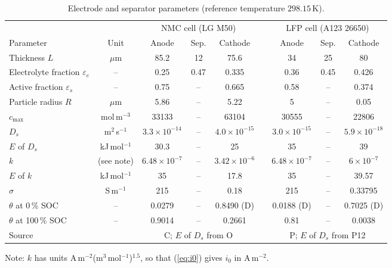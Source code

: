 \documentclass[11pt]{article}
\newcommand{\eps}{\varepsilon}
\newcommand{\unit}[1]{\,\mathrm{#1}}
\begin{document}
\begin{table}[ht]
\centering\small
\caption{Electrode and separator parameters (reference temperature $298.15\unit{K}$).}\label{tab:electrode}
\begin{tabular}{@{}l c ccc c ccc@{}}
\toprule
 & & \multicolumn{3}{c}{NMC cell (LG M50)} & & \multicolumn{3}{c}{LFP cell (A123 26650)}\\
\cmidrule{3-5}\cmidrule{7-9}
Parameter & Unit & Anode & Sep. & Cathode & & Anode & Sep. & Cathode\\
\midrule
Thickness $L$ & $\mu$m & 85.2 & 12 & 75.6 & & 34 & 25 & 80\\
Electrolyte fraction $\eps_e$ & -- & 0.25 & 0.47 & 0.335 & & 0.36 & 0.45 & 0.426\\
Active fraction $\eps_s$ & -- & 0.75 & -- & 0.665 & & 0.58 & -- & 0.374\\
Particle radius $R$ & $\mu$m & 5.86 & -- & 5.22 & & 5 & -- & 0.05\\
$c_{\max}$ & mol\,m$^{-3}$ & 33133 & -- & 63104 & & 30555 & -- & 22806\\
$D_s$ & m$^2$\,s$^{-1}$ & $3.3\!\times\!10^{-14}$ & -- & $4.0\!\times\!10^{-15}$ & & $3.0\!\times\!10^{-15}$ & -- & $5.9\!\times\!10^{-18}$\\
$E$ of $D_s$ & kJ\,mol$^{-1}$ & 30.3 & -- & 25 & & 35 & -- & 39\\
$k$ & (see note) & $6.48\!\times\!10^{-7}$ & -- & $3.42\!\times\!10^{-6}$ & & $6.48\!\times\!10^{-7}$ & -- & $6\!\times\!10^{-7}$\\
$E$ of $k$ & kJ\,mol$^{-1}$ & 35 & -- & 17.8 & & 35 & -- & 39.57\\
$\sigma$ & S\,m$^{-1}$ & 215 & -- & 0.18 & & 215 & -- & 0.33795\\
$\theta$ at 0\,\% SOC & -- & 0.0279 & -- & 0.8490 (D) & & 0.0188 (D) & -- & 0.7025 (D)\\
$\theta$ at 100\,\% SOC & -- & 0.9014 & -- & 0.2661 & & 0.81 & -- & 0.0038\\
\midrule
Source & & \multicolumn{3}{c}{C; $E$ of $D_s$ from O} & & \multicolumn{3}{c}{P; $E$ of $D_s$ from P12}\\
\bottomrule
\end{tabular}

\smallskip
\raggedright\footnotesize Note: $k$ has units A\,m$^{-2}$(m$^3$\,mol$^{-1}$)$^{1.5}$, so that (\ref{eq:i0}) gives $i_0$ in A\,m$^{-2}$.
\end{table}
\end{document}
